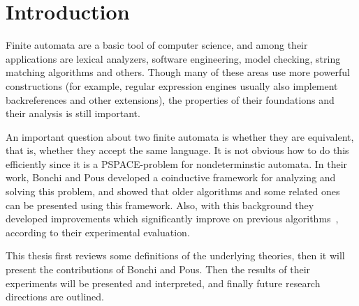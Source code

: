 \section{Introduction}

Finite automata are a basic tool of computer science, and among their
applications are lexical analyzers, software engineering, model checking,
string matching algorithms and others.
Though many of these areas use more powerful constructions
(for example, regular expression engines usually also implement backreferences
and other extensions),
the properties of their foundations and their analysis is still important.

An important question about two finite automata is whether they are equivalent,
that is, whether they accept the same language.
It is not obvious how to do this efficiently since it is a PSPACE-problem for nondeterminstic automata.
In their work, Bonchi and Pous developed a coinductive framework for analyzing
and solving this problem, and showed that older algorithms and some related ones can
be presented using this framework.
Also, with this background they developed improvements which significantly improve on previous
algorithms~\cite{abdulla2010simulation,doyen2010antichain}, according to
their experimental evaluation.

This thesis first reviews some definitions of the underlying theories, then
it will present the contributions of Bonchi and Pous.
Then the results of their experiments will be presented and interpreted,
and finally future research directions are outlined.
